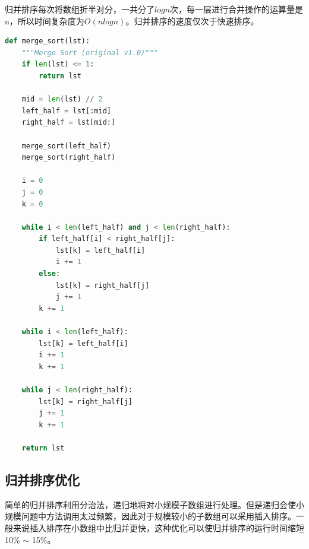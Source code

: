 归并排序每次将数组折半对分，一共分了$ logn $次，每一层进行合并操作的运算量是n，所以时间复杂度为$ O(nlogn) $。归并排序的速度仅次于快速排序。\\

\begin{table}[H]
	\centering
	\caption{归并排序算法分析}
\end{table}


\begin{lstlisting}[language=Python]
def merge_sort(lst):
    """Merge Sort (original v1.0)"""
    if len(lst) <= 1:
        return lst
    
    mid = len(lst) // 2
    left_half = lst[:mid]
    right_half = lst[mid:]

    merge_sort(left_half)
    merge_sort(right_half)

    i = 0
    j = 0
    k = 0

    while i < len(left_half) and j < len(right_half):
        if left_half[i] < right_half[j]:
            lst[k] = left_half[i]
            i += 1
        else:
            lst[k] = right_half[j]
            j += 1
        k += 1
    
    while i < len(left_half):
        lst[k] = left_half[i]
        i += 1
        k += 1
    
    while j < len(right_half):
        lst[k] = right_half[j]
        j += 1
        k += 1
    
    return lst
\end{lstlisting}

\vspace{0.5cm}

\subsection{归并排序优化}

简单的归并排序利用分治法，递归地将对小规模子数组进行处理。但是递归会使小规模问题中方法调用太过频繁，因此对于规模较小的子数组可以采用插入排序。一般来说插入排序在小数组中比归并更快，这种优化可以使归并排序的运行时间缩短10\% $ \sim $ 15\%。\\

